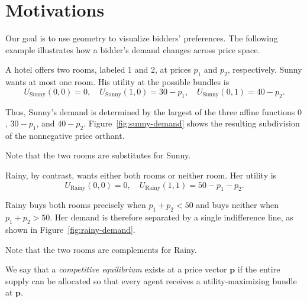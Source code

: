 \documentclass[../../main.tex]{subfiles}
\begin{document}
\section{Motivations}

Our goal is to use geometry to visualize bidders' preferences.
The following example illustrates how a bidder's demand changes
across price space.

\begin{example} \label{example:sunny-rainy}
    A hotel offers two rooms, labeled 1 and 2, at prices $p_1$ and $p_2$,
    respectively. Sunny wants at most one room. His utility at the possible
    bundles is
    \[
        U_{\text{Sunny}}(0,0)=0,\quad
        U_{\text{Sunny}}(1,0)=30-p_1,\quad
        U_{\text{Sunny}}(0,1)=40-p_2.
    \]

    Thus, Sunny's demand is determined by the largest of the three affine
    functions $0$, $30-p_1$, and $40-p_2$. Figure~\ref{fig:sunny-demand}
    shows the resulting subdivision of the nonnegative price orthant.

    \SunnyDemandFigure

    Note that the two rooms are substitutes for Sunny.

    Rainy, by contrast, wants either both rooms or neither room. Her utility is
    \[
        U_{\text{Rainy}}(0,0)=0,\quad
        U_{\text{Rainy}}(1,1)=50-p_1-p_2.
    \]

    Rainy buys both rooms precisely when $p_1+p_2<50$ and buys neither
    when $p_1+p_2>50$. Her demand is therefore separated by a single
    indifference line, as shown in Figure~\ref{fig:rainy-demand}.

    \RainyDemandFigure

    Note that the two rooms are complements for Rainy.
\end{example}

We say that a \textit{competitive equilibrium} exists at a price vector $\mathbf{p}$ if
the entire supply can be allocated so that every agent receives a
utility-maximizing bundle at $\mathbf{p}$.
\end{document}
